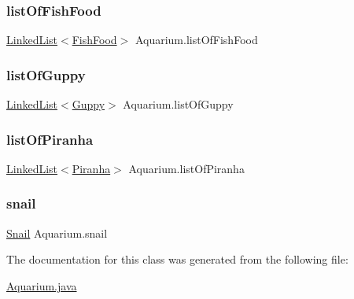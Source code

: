 \subsubsection{\texorpdfstring{list\+Of\+Fish\+Food}{listOfFishFood}}
{\footnotesize\ttfamily \mbox{\hyperlink{class_linked_list}{Linked\+List}}$<$\mbox{\hyperlink{class_fish_food}{Fish\+Food}}$>$ Aquarium.\+list\+Of\+Fish\+Food\hspace{0.3cm}{\ttfamily [private]}}

\mbox{\label{class_aquarium_a020d5cd650fba937c38d7b25aed6effd}} 
\subsubsection{\texorpdfstring{list\+Of\+Guppy}{listOfGuppy}}
{\footnotesize\ttfamily \mbox{\hyperlink{class_linked_list}{Linked\+List}}$<$\mbox{\hyperlink{class_guppy}{Guppy}}$>$ Aquarium.\+list\+Of\+Guppy\hspace{0.3cm}{\ttfamily [private]}}

\mbox{\label{class_aquarium_a21cb53c360484e651bde146b4645ca4a}} 
\subsubsection{\texorpdfstring{list\+Of\+Piranha}{listOfPiranha}}
{\footnotesize\ttfamily \mbox{\hyperlink{class_linked_list}{Linked\+List}}$<$\mbox{\hyperlink{class_piranha}{Piranha}}$>$ Aquarium.\+list\+Of\+Piranha\hspace{0.3cm}{\ttfamily [private]}}

\mbox{\label{class_aquarium_a181508459b3020488aa97664daeb79ac}} 
\subsubsection{\texorpdfstring{snail}{snail}}
{\footnotesize\ttfamily \mbox{\hyperlink{class_snail}{Snail}} Aquarium.\+snail\hspace{0.3cm}{\ttfamily [private]}}



The documentation for this class was generated from the following file\+:\begin{DoxyCompactItemize}
\item 
\mbox{\hyperlink{_aquarium_8java}{Aquarium.\+java}}\end{DoxyCompactItemize}
